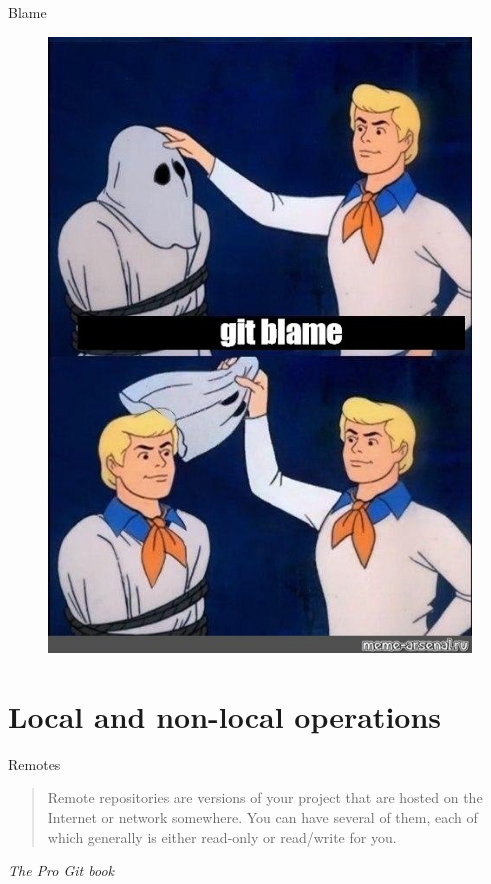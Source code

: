 \documentclass[10pt,aspectratio=169]{beamer}
\begin{document}
\begin{frame}[fragile]{Blame}
    \begin{figure}
        \centering
        \includegraphics[scale=0.4]{memes/meme-git-blame.jpg}
    \end{figure}
\end{frame}

\section{Local and non-local operations}

\begin{frame}[fragile]{Remotes}
    \begin{quote}
        Remote repositories are versions of your project that are hosted on the Internet or network somewhere. You can have several of them, each of which generally is either read-only or read/write for you.
    \end{quote}
    \begin{flushright}
        \textit{The Pro Git book}
    \end{flushright}
\end{frame}
\end{document}
